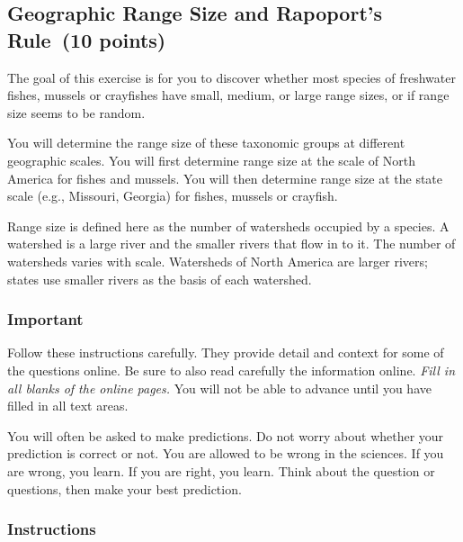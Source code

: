 \documentclass[11pt]{article}
\newcommand{\assignmentTitle}{Geographic Range Size and Rapoport's Rule}
\begin{document}
\thispagestyle{firstpage}

\subsection*{\assignmentTitle\ (10 points)}

The goal of this exercise is for you to discover whether most species of
freshwater fishes, mussels or crayfishes have
small, medium, or large range sizes, or if range size seems to be random.

You will determine the range size of these taxonomic groups at
different geographic scales. You will first determine range size at the
scale of North America for  fishes and mussels. You will
then determine range size at the state scale (e.g., Missouri, Georgia)
for fishes, mussels or crayfish. 

Range size is defined here as the number of watersheds 
occupied by a species. A watershed is a large river and the smaller
rivers that flow in to it. The number of watersheds varies with scale. 
Watersheds of North America are larger rivers; states use smaller rivers
as the basis of each watershed. 

\subsubsection*{Important}

Follow these instructions carefully. They provide detail and context for some
of the questions online.  Be sure to also read carefully the 
information online.  \emph{Fill in all blanks of the online pages.} You will not be 
able to advance until you have filled in all text areas.

You will often be asked to make predictions. Do not worry about whether your
prediction is correct or not. You are allowed to be wrong in the sciences. If you are wrong,
you learn. If you are right, you learn.  Think about the question or questions, then make your
best prediction.

\subsubsection*{Instructions}
\end{document}
